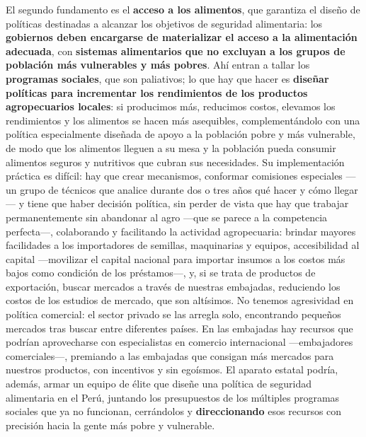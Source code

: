 \documentclass[
  man,
  floatsintext,
  longtable,
  a4paper,
  nolmodern,
  notxfonts,
  notimes,
  12pt,
  colorlinks=true,linkcolor=blue,citecolor=blue,urlcolor=blue]{apa7}
\begin{document}
El segundo fundamento es el \textbf{acceso a los alimentos}, que
garantiza el diseño de políticas destinadas a alcanzar los objetivos de
seguridad alimentaria: los \textbf{gobiernos deben encargarse de
materializar el acceso a la alimentación adecuada}, con \textbf{sistemas
alimentarios que no excluyan a los grupos de población más vulnerables y
más pobres}. Ahí entran a tallar los \textbf{programas sociales}, que
son paliativos; lo que hay que hacer es \textbf{diseñar políticas para
incrementar los rendimientos de los productos agropecuarios locales}: si
producimos más, reducimos costos, elevamos los rendimientos y los
alimentos se hacen más asequibles, complementándolo con una política
especialmente diseñada de apoyo a la población pobre y más vulnerable,
de modo que los alimentos lleguen a su mesa y la población pueda
consumir alimentos seguros y nutritivos que cubran sus necesidades. Su
implementación práctica es difícil: hay que crear mecanismos, conformar
comisiones especiales ---un grupo de técnicos que analice durante dos o
tres años qué hacer y cómo llegar--- y tiene que haber decisión
política, sin perder de vista que hay que trabajar permanentemente sin
abandonar al agro ---que se parece a la competencia perfecta---,
colaborando y facilitando la actividad agropecuaria: brindar mayores
facilidades a los importadores de semillas, maquinarias y equipos,
accesibilidad al capital ---movilizar el capital nacional para importar
insumos a los costos más bajos como condición de los préstamos---, y, si
se trata de productos de exportación, buscar mercados a través de
nuestras embajadas, reduciendo los costos de los estudios de mercado,
que son altísimos. No tenemos agresividad en política comercial: el
sector privado se las arregla solo, encontrando pequeños mercados tras
buscar entre diferentes países. En las embajadas hay recursos que
podrían aprovecharse con especialistas en comercio internacional
---embajadores comerciales---, premiando a las embajadas que consigan
más mercados para nuestros productos, con incentivos y sin egoísmos. El
aparato estatal podría, además, armar un equipo de élite que diseñe una
política de seguridad alimentaria en el Perú, juntando los presupuestos
de los múltiples programas sociales que ya no funcionan, cerrándolos y
\textbf{direccionando} esos recursos con precisión hacia la gente más
pobre y vulnerable.
\end{document}
